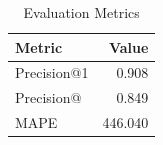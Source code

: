 \begin{table}

\caption{Evaluation Metrics}
\centering
\begin{tabular}[t]{lr}
\toprule
Metric & Value\\
\midrule
Precision@1 & 0.908\\
Precision@ & 0.849\\
MAPE & 446.040\\
\bottomrule
\end{tabular}
\end{table}
